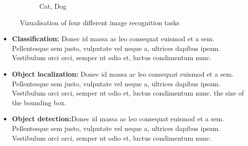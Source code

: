 \begin{figure}[h]
\begin{subfigure}[b]{0.245\textwidth}
     \caption{Cat, Dog}
     \label{fig:CatDogTwo}
   \end{subfigure}
  \caption{Vizualisation of four different image recognition tasks }
  \label{fig:class_det}
\end{figure}

\begin{itemize}
\item \textbf{Classification:} Donec id massa ac leo consequat euismod et a sem. Pellentesque sem justo, vulputate vel neque a, ultrices dapibus ipsum. Vestibulum orci orci, semper ut odio et, luctus condimentum nunc.
\item \textbf{Object localization:} Donec id massa ac leo consequat euismod et a sem. Pellentesque sem justo, vulputate vel neque a, ultrices dapibus ipsum. Vestibulum orci orci, semper ut odio et, luctus condimentum nunc.  the size of the bounding box.
\item \textbf{Object detection:}Donec id massa ac leo consequat euismod et a sem. Pellentesque sem justo, vulputate vel neque a, ultrices dapibus ipsum. Vestibulum orci orci, semper ut odio et, luctus condimentum nunc.

\end{itemize}

